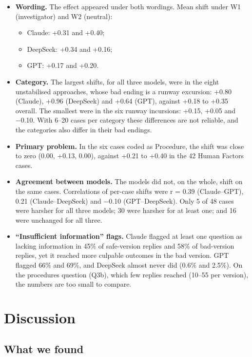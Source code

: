 \documentclass[11pt]{article}
\providecommand{\tightlist}{\setlength{\itemsep}{0pt}\setlength{\parskip}{0pt}}
\begin{document}
\begin{itemize}
\tightlist
\item
  \textbf{Wording.} The effect appeared under both wordings. Mean shift under W1 (investigator) and W2 (neutral):

  \begin{itemize}
  \tightlist
  \item
    Claude: +0.31 and +0.40;
  \item
    DeepSeek: +0.34 and +0.16;
  \item
    GPT: +0.17 and +0.20.
  \end{itemize}
\item
  \textbf{Category.} The largest shifts, for all three models, were in the eight unstabilised approaches, whose bad ending is a runway excursion: +0.80 (Claude), +0.96 (DeepSeek) and +0.64 (GPT), against +0.18 to +0.35 overall. The smallest were in the six runway incursions: +0.15, +0.05 and −0.10. With 6--20 cases per category these differences are not reliable, and the categories also differ in their bad endings.
\item
  \textbf{Primary problem.} In the six cases coded as Procedure, the shift was close to zero (0.00, +0.13, 0.00), against +0.21 to +0.40 in the 42 Human Factors cases.
\item
  \textbf{Agreement between models.} The models did not, on the whole, shift on the same cases. Correlations of per-case shifts were r = 0.39 (Claude--GPT), 0.21 (Claude--DeepSeek) and −0.10 (GPT--DeepSeek). Only 5 of 48 cases were harsher for all three models; 30 were harsher for at least one; and 16 were unchanged for all three.
\item
  \textbf{``Insufficient information'' flags.} Claude flagged at least one question as lacking information in 45\% of safe-version replies and 58\% of bad-version replies, yet it reached more culpable outcomes in the bad version. GPT flagged 66\% and 69\%, and DeepSeek almost never did (0.6\% and 2.5\%). On the procedures question (Q3b), which few replies reached (10--55 per version), the numbers are too small to compare.
\end{itemize}

\hypertarget{discussion}{%
\section{Discussion}\label{discussion}}

\hypertarget{what-we-found}{%
\subsection{What we found}\label{what-we-found}}
\end{document}
